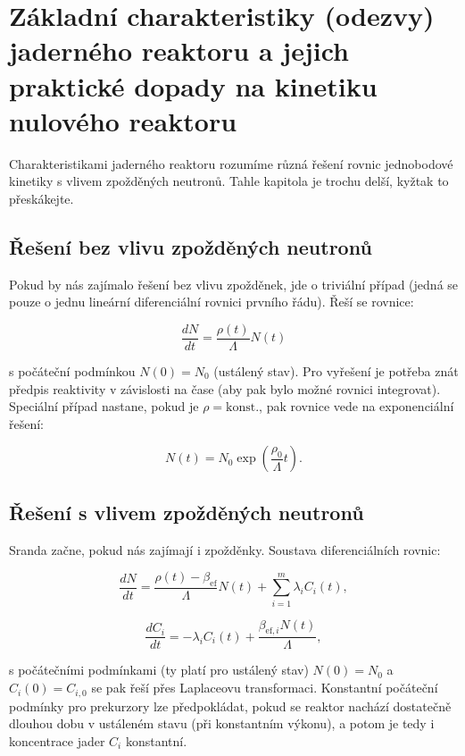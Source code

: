 \section[Základní charakteristiky jednobodové kinitiky]{Základní charakteristiky (odezvy) jaderného reaktoru a jejich praktické dopady na kinetiku nulového reaktoru}

Charakteristikami jaderného reaktoru rozumíme různá řešení rovnic jednobodové kinetiky s vlivem zpožděných neutronů. Tahle kapitola je trochu delší, kyžtak to přeskákejte.

\subsection{Řešení bez vlivu zpožděných neutronů}

Pokud by nás zajímalo řešení bez vlivu zpožděnek, jde o triviální případ (jedná se pouze o jednu lineární diferenciální rovnici prvního řádu). Řeší se rovnice:

$$ \dfrac{dN}{dt} = \dfrac{\rho (t)}{\Lambda} N(t) $$

s počáteční podmínkou $N(0) = N_0$ (ustálený stav). Pro vyřešení je potřeba znát předpis reaktivity v závislosti na čase (aby pak bylo možné rovnici integrovat). Speciální případ nastane, pokud je $\rho = \text{konst.}$, pak rovnice vede na exponenciální řešení:

\begin{equation}
  N(t) = N_0 \exp \left ( \dfrac{\rho_0}{\Lambda} t \right ).
\end{equation}

\subsection{Řešení s vlivem zpožděných neutronů}

Sranda začne, pokud nás zajímají i zpožděnky. Soustava diferenciálních rovnic:

$$ \dfrac{dN}{dt} = \dfrac{\rho(t) - \beta_{\text{ef}}}{\Lambda} N(t) + \sum_{i=1}^m \lambda_i C_i(t), $$

$$ \dfrac{dC_i}{dt} = -\lambda_i C_i(t) + \dfrac{\beta_{\text{ef},i}  N(t)}{\Lambda}, $$

s počátečními podmínkami (ty platí pro ustálený stav) $N(0) = N_0$ a $C_i(0) = C_{i,0}$ se pak řeší přes Laplaceovu transformaci. Konstantní počáteční podmínky pro prekurzory lze předpokládat, pokud se reaktor nachází dostatečně dlouhou dobu v ustáleném stavu (při konstantním výkonu), a potom je tedy i koncentrace jader $C_i$ konstantní.

